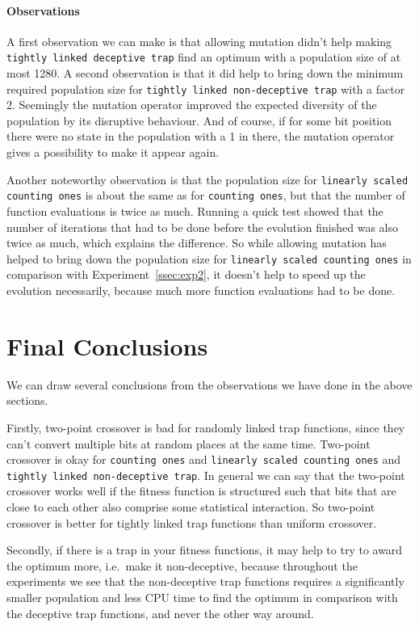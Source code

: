 \documentclass[12pt]{article}
\theoremstyle{definition}
\newcommand{\co}{\texttt{counting ones}}
\newcommand{\lsco}{\texttt{linearly scaled counting ones}}
\newcommand{\tdt}{\texttt{tightly linked deceptive trap}}
\newcommand{\tnt}{\texttt{tightly linked non-deceptive trap}}
\begin{document}
\paragraph{Observations}
A first observation we can make is that allowing mutation didn't help making \tdt{} find
an optimum with a population size of at most 1280.
A second observation is that it did help to bring down the minimum required population size
for \tnt{} with a factor 2.
Seemingly the mutation operator improved the expected diversity of the population by its
disruptive behaviour.
And of course, if for some bit position there were no state in the population with a 1 in there,
the mutation operator gives a possibility to make it appear again.

Another noteworthy observation is that the population size for \lsco{} is about the same
as for \co{}, but that the number of function evaluations is twice as much.
Running a quick test showed that the number of iterations that had to be done before the
evolution finished was also twice as much, which explains the difference.
So while allowing mutation has helped to bring down the population size for \lsco{}
in comparison with Experiment~\ref{ssec:exp2},
it doesn't help to speed up the evolution necessarily, because much more
function evaluations had to be done.


\section*{Final Conclusions}

We can draw several conclusions from the observations we have done in the above sections.

Firstly, two-point crossover is bad for randomly linked trap functions,
since they can't convert multiple bits at random places at the same time.
Two-point crossover is okay for \co{} and \lsco{} and \tnt{}.
In general we can say that the two-point crossover works well if the fitness function is
structured such that bits that are close to each other also comprise some statistical interaction.
So two-point crossover is better for tightly linked trap functions than uniform crossover.

Secondly, if there is a trap in your fitness functions, it may help to try to award the optimum more,
i.e.\ make it non-deceptive, because throughout the experiments we see that the
non-deceptive trap functions requires a significantly smaller population and less CPU time to find
the optimum in comparison with the deceptive trap functions, and never the other way around.
\end{document}
